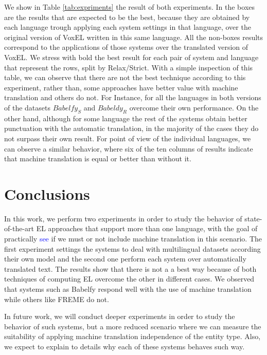 \documentclass{llncs}
\begin{document}
We show in Table \ref{tab:expriments} the result of both experiments. In the boxes are the results that are expected to be the best, because they are obtained by each language trough applying each system settings in that language, over the original version of VoxEL written in this same language. All the non-boxes results correspond to the applications of those systems over the translated version of VoxEL. We stress with bold the best result for each pair of system and language that represent the rows, split by Relax/Strict. With a simple inspection of this table, we can observe that there are not the best technique according to this experiment, rather than, some approaches have better value with machine translation and others do not. For Instance, for all the languages in both versions of the datasets $Babelfy_S$ and $Babeldy_R$ overcome their own performance. On the other hand, although for some language the rest of the systems obtain better punctuation with the automatic translation, in the majority of the cases they do not surpass their own result. For point of view of the individual languages, we can observe a similar behavior, where six of the ten columns of results indicate that machine translation is equal or better than without it.  


\section{Conclusions}

In this work, we perform two experiments in order to study the behavior of state-of-the-art EL approaches that support more than one language, with the goal of practically \textcolor{blue}{see} if we must or not include machine translation in this scenario. The first experiment settings the systems to deal with multilingual datasets according their own model and the second one perform each system over automatically translated text. The results show that there is not a a best way because of both techniques of computing EL overcome the other in different cases. We observed that systems such as Babelfy respond well with the use of machine translation while others like FREME do not.

In future work, we will conduct deeper experiments in order to study the behavior of such systems, but a more reduced scenario where we can measure the suitability of applying machine translation independence of the entity type. Also, we expect to explain to details why each of these systems behaves such way.
\end{document}
